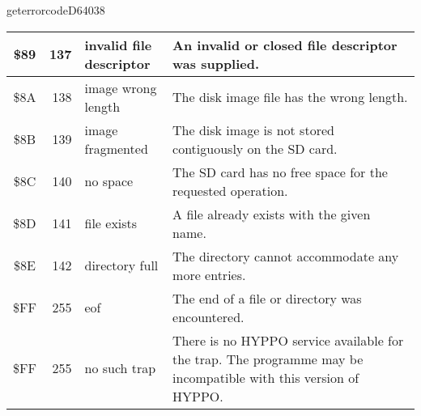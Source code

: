 \begin{hyppotrap}{geterrorcode}{D640}{38}
{\begin{longtable}{|c|r|l|p{8cm}|}
    \\\hline
    \index{HYPPO Error Codes!\$89}
    \$89 & 137 & \makecell[tl]{invalid file\\descriptor} &
    An invalid or closed file descriptor was supplied.
    \\\hline
    \index{HYPPO Error Codes!\$8A}
    \$8A & 138 & \makecell[tl]{image wrong\\length} &
    The disk image file has the wrong length.
    \\\hline
    \index{HYPPO Error Codes!\$8B}
    \$8B & 139 & image fragmented &
    The disk image is not stored contiguously on the SD card.
    \\\hline
    \index{HYPPO Error Codes!\$8C}
    \$8C & 140 & no space &
    The SD card has no free space for the requested operation.
    \\\hline
    \index{HYPPO Error Codes!\$8D}
    \$8D & 141 & file exists &
    A file already exists with the given name.
    \\\hline
    \index{HYPPO Error Codes!\$8E}
    \$8E & 142 & directory full &
    The directory cannot accommodate any more entries.
    \\\hline
    \index{HYPPO Error Codes!\$FF}
    \$FF & 255 & eof &
    The end of a file or directory was encountered.
    \\\hline
    \index{HYPPO Error Codes!\$FF}
    \$FF & 255 & no such trap &
    There is no HYPPO service available for the trap. The programme may be
    incompatible with this version of HYPPO.
    \\\hline
  \end{longtable}
}
\end{hyppotrap}


